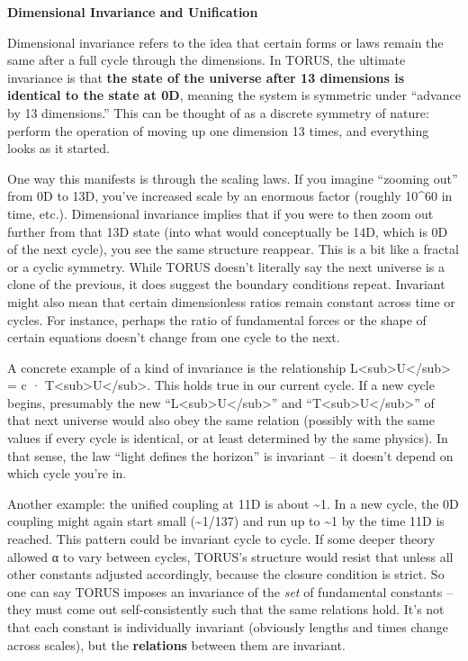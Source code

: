\textbf{Dimensional Invariance and Unification}

Dimensional invariance refers to the idea that certain forms or laws
remain the same after a full cycle through the dimensions. In TORUS, the
ultimate invariance is that \textbf{the state of the universe after 13
dimensions is identical to the state at 0D}, meaning the system is
symmetric under ``advance by 13 dimensions.'' This can be thought of as
a discrete symmetry of nature: perform the operation of moving up one
dimension 13 times, and everything looks as it started​.

One way this manifests is through the scaling laws. If you imagine
``zooming out'' from 0D to 13D, you've increased scale by an enormous
factor (roughly 10\^{}60 in time, etc.). Dimensional invariance implies
that if you were to then zoom out further from that 13D state (into what
would conceptually be 14D, which is 0D of the next cycle), you see the
same structure reappear. This is a bit like a fractal or a cyclic
symmetry. While TORUS doesn't literally say the next universe is a clone
of the previous, it does suggest the boundary conditions repeat.
Invariant might also mean that certain dimensionless ratios remain
constant across time or cycles. For instance, perhaps the ratio of
fundamental forces or the shape of certain equations doesn't change from
one cycle to the next.

A concrete example of a kind of invariance is the relationship
L\textless{}sub\textgreater{}U\textless{}/sub\textgreater{} = c ·
T\textless{}sub\textgreater{}U\textless{}/sub\textgreater{}. This holds
true in our current cycle. If a new cycle begins, presumably the new
``L\textless{}sub\textgreater{}U\textless{}/sub\textgreater{}'' and
``T\textless{}sub\textgreater{}U\textless{}/sub\textgreater{}'' of that
next universe would also obey the same relation (possibly with the same
values if every cycle is identical, or at least determined by the same
physics). In that sense, the law ``light defines the horizon'' is
invariant -- it doesn't depend on which cycle you're in.

Another example: the unified coupling at 11D is about
\textasciitilde{}1. In a new cycle, the 0D coupling might again start
small (\textasciitilde{}1/137) and run up to \textasciitilde{}1 by the
time 11D is reached. This pattern could be invariant cycle to cycle. If
some deeper theory allowed α to vary between cycles, TORUS's structure
would resist that unless all other constants adjusted accordingly,
because the closure condition is strict. So one can say TORUS imposes an
invariance of the \emph{set} of fundamental constants -- they must come
out self-consistently such that the same relations hold. It's not that
each constant is individually invariant (obviously lengths and times
change across scales), but the \textbf{relations} between them are
invariant.

